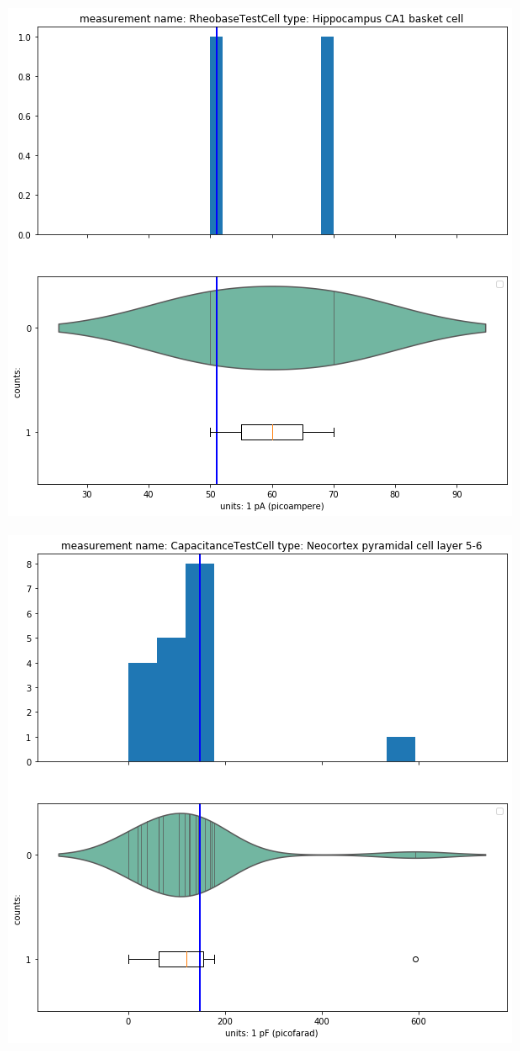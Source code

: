     \begin{center}
    \includegraphics[width=0.7\linewidth]{notebooks_converted/needata_thesis_files/needata_thesis_5_11}
    \end{center}

    \begin{center}
    \includegraphics[width=0.7\linewidth]{notebooks_converted/needata_thesis_files/needata_thesis_5_12}
    \end{center}

